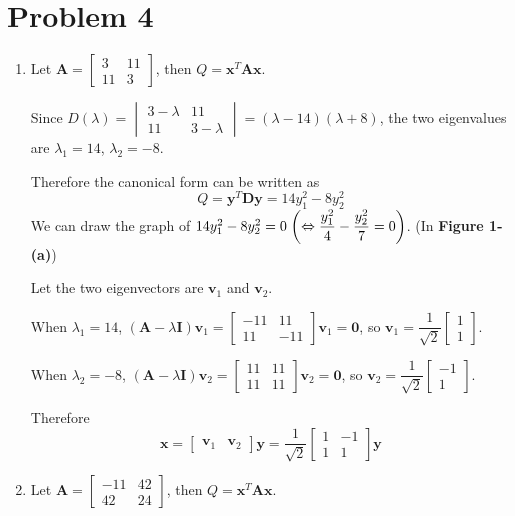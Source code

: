 \documentclass[10pt]{article}
\begin{document}
\section*{Problem 4}
\begin{enumerate}[leftmargin=*, label={(\alph*)}]
    \item Let $\mathbf{A} = \begin{bmatrix}
        3 & 11 \\ 11 & 3
    \end{bmatrix}$, then $Q = \mathbf{x}^T\mathbf{Ax}$.

    Since $D(\lambda) = \begin{vmatrix}
        3 - \lambda & 11 \\ 11 & 3 - \lambda
    \end{vmatrix} = (\lambda-14)(\lambda+8)$, the two eigenvalues are $\lambda_1 = 14$, $\lambda_2 = -8$.

    Therefore the canonical form can be written as
    $$Q = \mathbf{y}^T\mathbf{Dy} = 14y_1^2 - 8y_2^2$$
    We can draw the graph of $14y_1^2 - 8y_2^2 = 0 \; \qty(\Leftrightarrow \dfrac{y_1^2}{4} - \dfrac{y_2^2}{7} = 0)$. (In \textbf{Figure 1-(a)})

    Let the two eigenvectors are $\mathbf{v}_1$ and $\mathbf{v}_2$.

    When $\lambda_1 = 14$, $(\mathbf{A} - \lambda\mathbf{I})\mathbf{v}_1 = \begin{bmatrix}
        -11 & 11 \\ 11 & -11
    \end{bmatrix}\mathbf{v}_1 = \mathbf{0}$, so $\mathbf{v}_1 = \dfrac{1}{\sqrt{2}}\begin{bmatrix} 1 \\ 1 \end{bmatrix}$.

    When $\lambda_2 = -8$, $(\mathbf{A} - \lambda\mathbf{I})\mathbf{v}_2 = \begin{bmatrix}
        11 & 11 \\ 11 & 11
    \end{bmatrix}\mathbf{v}_2 = \mathbf{0}$, so $\mathbf{v}_2 = \dfrac{1}{\sqrt{2}}\begin{bmatrix} -1 \\ 1 \end{bmatrix}$.

    Therefore 
    $$\mathbf{x} = \begin{bmatrix} \mathbf{v}_1 & \mathbf{v}_2 \end{bmatrix}\mathbf{y} = \frac{1}{\sqrt{2}}\begin{bmatrix}
        1 & -1 \\ 1 & 1
    \end{bmatrix}\mathbf{y}$$
    \item Let $\mathbf{A} = \begin{bmatrix}
        -11 & 42 \\ 42 & 24
    \end{bmatrix}$, then $Q = \mathbf{x}^T\mathbf{Ax}$.


\end{enumerate}
\end{document}

